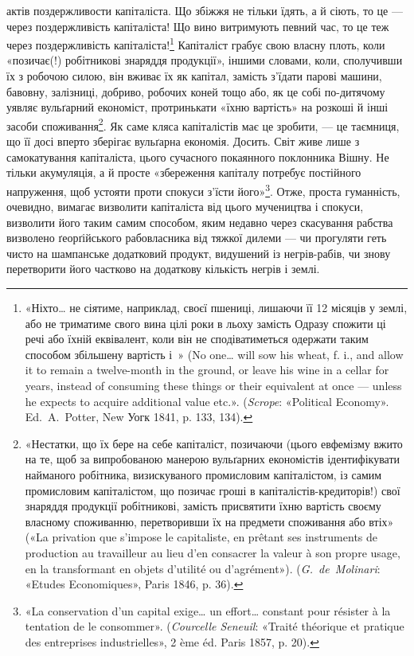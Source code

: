 актів поздержливости капіталіста. Що збіжжя не тільки їдять,
а й сіють, то це — через поздержливість капіталіста! Що вино
витримують певний час, то це теж через поздержливість капіталіста!\footnote{
«Ніхто\dots{} не сіятиме, наприклад, своєї пшениці, лишаючи її
12 місяців у землі, або не триматиме свого вина цілі роки в льоху замість
Одразу спожити ці речі або їхній еквівалент, коли він не сподіватиметься
одержати таким способом збільшену вартість і~» (No one\dots{} will sow
his wheat, f. i., and allow it to remain a twelve-month in the ground,
or leave his wine in a cellar for years, instead of consuming these things
or their equivalent at once — unless he expects to acquire additional value
etc.». (\emph{Scrope}: «Political Economy». Ed.~A.~Potter, New Уогк 1841,
p. 133, 134).
} Капіталіст грабує свою власну плоть, коли «позичає(!)
робітникові знаряддя продукції», іншими словами, коли,
сполучивши їх з робочою силою, він вживає їх як капітал, замість
з’їдати парові машини, бавовну, залізниці, добриво, робочих
коней тощо або, як це собі по-дитячому уявляє вульґарний
економіст, протринькати «їхню вартість» на розкоші
й інші засоби споживання\footnote{
«Нестатки, що їх бере на себе капіталіст, позичаючи (цього
евфемізму вжито на те, щоб за випробованою манерою вульґарних економістів
ідентифікувати найманого робітника, визискуваного промисловим
капіталістом, із самим промисловим капіталістом, що позичає гроші
в капіталістів-кредиторів!) свої знаряддя продукції робітникові, замість
присвятити їхню вартість своєму власному споживанню, перетворивши
їх на предмети споживання або втіх» («La privation que s’impose le
capitaliste, en prêtant ses instruments de production au travailleur au lieu
d’en consacrer la valeur à son propre usage, en la transformant en objets
d'utilité ou d’agrément»). (\emph{G.~de~Molinari}: «Etudes Economiques», Paris
1846, p. 36).
}. Як саме кляса капіталістів має
це зробити, — це таємниця, що її досі вперто зберігає вульґарна
економія. Досить. Світ живе лише з самокатування капіталіста,
цього сучасного покаянного поклонника Вішну. Не тільки
акумуляція, а й просте «збереження капіталу потребує постійного
напруження, щоб устояти проти спокуси з’їсти його»\footnote{
«La conservation d’un capital exige\dots{} un effort\dots{} constant pour
résister à la tentation de le consommer». (\emph{Courcelle Seneuil}: «Traité
théorique et pratique des entreprises industrielles», 2 ème éd. Paris 1857, p. 20).
}.
Отже, проста гуманність, очевидно, вимагає визволити капіталіста
від цього мучеництва і спокуси, визволити його таким самим
способом, яким недавно через скасування рабства визволено
ґеорґійського рабовласника від тяжкої дилеми — чи прогуляти
геть чисто на шампанське додатковий продукт, видушений із
негрів-рабів, чи знову перетворити його частково на додаткову
кількість негрів і землі.

